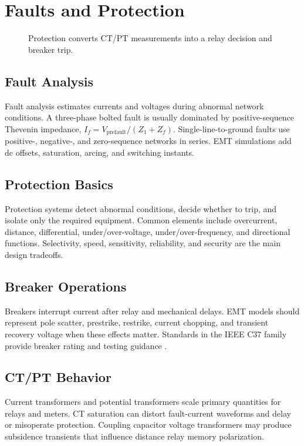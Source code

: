 \documentclass[11pt]{article}
\begin{document}
\section{Faults and Protection}
\begin{figure}[h]
\centering

\caption{Protection converts CT/PT measurements into a relay decision and breaker trip.}
\end{figure}

\subsection{Fault Analysis}
Fault analysis estimates currents and voltages during abnormal network conditions. A three-phase bolted fault is usually dominated by positive-sequence Thevenin impedance, $I_f=V_{\mathrm{prefault}}/(Z_1+Z_f)$. Single-line-to-ground faults use positive-, negative-, and zero-sequence networks in series. EMT simulations add dc offsets, saturation, arcing, and switching instants.

\subsection{Protection Basics}
Protection systems detect abnormal conditions, decide whether to trip, and isolate only the required equipment. Common elements include overcurrent, distance, differential, under/over-voltage, under/over-frequency, and directional functions. Selectivity, speed, sensitivity, reliability, and security are the main design tradeoffs.

\subsection{Breaker Operations}
Breakers interrupt current after relay and mechanical delays. EMT models should represent pole scatter, prestrike, restrike, current chopping, and transient recovery voltage when these effects matter. Standards in the IEEE C37 family provide breaker rating and testing guidance \cite{ieeec37}.

\subsection{CT/PT Behavior}
Current transformers and potential transformers scale primary quantities for relays and meters. CT saturation can distort fault-current waveforms and delay or misoperate protection. Coupling capacitor voltage transformers may produce subsidence transients that influence distance relay memory polarization.
\end{document}
